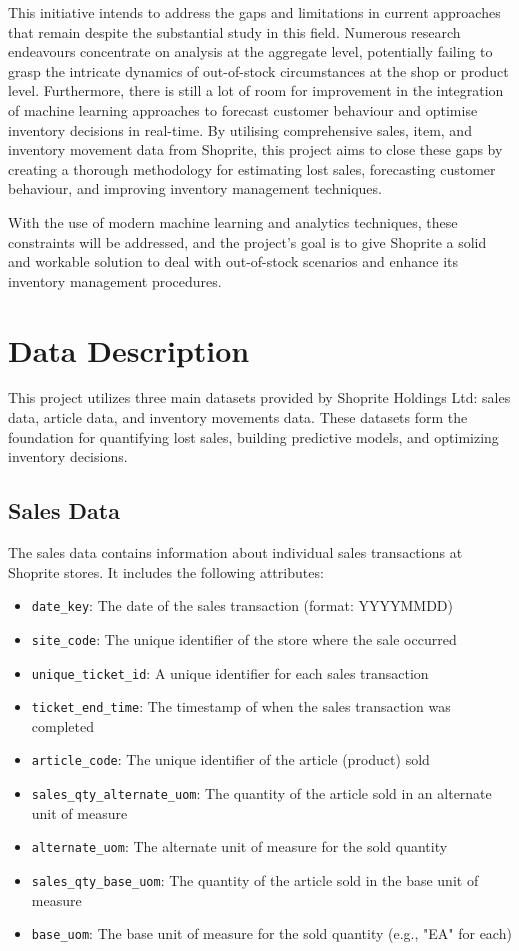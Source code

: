 \documentclass{article}
\begin{document}
This initiative intends to address the gaps and limitations in current approaches that remain despite the substantial study in this field. Numerous research endeavours concentrate on analysis at the aggregate level, potentially failing to grasp the intricate dynamics of out-of-stock circumstances at the shop or product level. Furthermore, there is still a lot of room for improvement in the integration of machine learning approaches to forecast customer behaviour and optimise inventory decisions in real-time. By utilising comprehensive sales, item, and inventory movement data from Shoprite, this project aims to close these gaps by creating a thorough methodology for estimating lost sales, forecasting customer behaviour, and improving inventory management techniques.

With the use of modern machine learning and analytics techniques, these constraints will be addressed, and the project's goal is to give Shoprite a solid and workable solution to deal with out-of-stock scenarios and enhance its inventory management procedures.

\section{Data Description}

This project utilizes three main datasets provided by Shoprite Holdings Ltd: sales data, article data, and inventory movements data. These datasets form the foundation for quantifying lost sales, building predictive models, and optimizing inventory decisions.

\subsection{Sales Data}
The sales data contains information about individual sales transactions at Shoprite stores. It includes the following attributes:
\begin{itemize}
  \item \texttt{date\_key}: The date of the sales transaction (format: YYYYMMDD)
  \item \texttt{site\_code}: The unique identifier of the store where the sale occurred
  \item \texttt{unique\_ticket\_id}: A unique identifier for each sales transaction
  \item \texttt{ticket\_end\_time}: The timestamp of when the sales transaction was completed
  \item \texttt{article\_code}: The unique identifier of the article (product) sold
  \item \texttt{sales\_qty\_alternate\_uom}: The quantity of the article sold in an alternate unit of measure
  \item \texttt{alternate\_uom}: The alternate unit of measure for the sold quantity
  \item \texttt{sales\_qty\_base\_uom}: The quantity of the article sold in the base unit of measure
  \item \texttt{base\_uom}: The base unit of measure for the sold quantity (e.g., "EA" for each)
\end{itemize}
\end{document}
